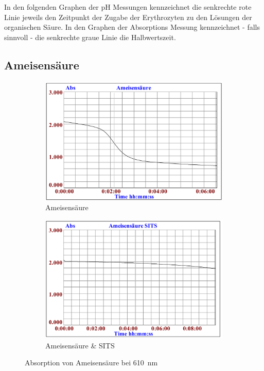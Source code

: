 \documentclass[a4paper,german]{scrreprt}
\begin{document}
In den folgenden Graphen der pH Messungen kennzeichnet die senkrechte rote
Linie jeweils den Zeitpunkt der Zugabe der Erythrozyten zu den Lösungen der
organischen Säure. In den Graphen der Absorptions Messung kennzeichnet - falls
sinnvoll - die senkrechte graue Linie die Halbwertszeit.

\subsection{Ameisensäure}

\begin{figure}
	\centering
	\begin{subfigure}{.5\textwidth}
		\centering
		\includegraphics[width=\linewidth]{img/haem_ameisen.png}
		\caption{Ameisensäure}
	\end{subfigure}%
	\begin{subfigure}{.5\textwidth}
		\centering
		\includegraphics[width=\linewidth]{img/haem_ameisen_sits.png}
		\caption{Ameisensäure \& SITS}
	\end{subfigure}
	\caption{Absorption von Ameisensäure bei \SI{610}{nm}}
	\label{fig:haem_ameisen}
\end{figure}
\end{document}
